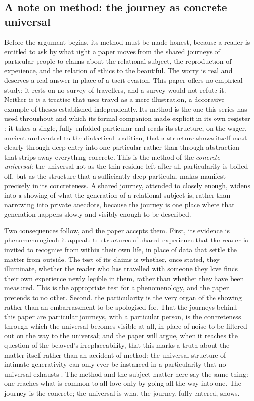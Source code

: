 \subsection{A note on method: the journey as concrete universal}
\label{p21:sub:intro-method}

Before the argument begins, its method must be made honest, because a reader is entitled to ask by what right a paper moves from the shared journeys of particular people to claims about the relational subject, the reproduction of experience, and the relation of ethics to the beautiful. The worry is real and deserves a real answer in place of a tacit evasion. This paper offers no empirical study; it rests on no survey of travellers, and a survey would not refute it. Neither is it a treatise that uses travel as a mere illustration, a decorative example of theses established independently. Its method is the one this series has used throughout and which its formal companion made explicit in its own register \parencite{wan2026braid}: it takes a single, fully unfolded particular and reads its structure, on the wager, ancient and central to the dialectical tradition, that a structure shows itself most clearly through deep entry into one particular rather than through abstraction that strips away everything concrete. This is the method of the \emph{concrete universal}: the universal not as the thin residue left after all particularity is boiled off, but as the structure that a sufficiently deep particular makes manifest precisely in its concreteness. A shared journey, attended to closely enough, widens into a showing of what the generation of a relational subject is, rather than narrowing into private anecdote, because the journey is one place where that generation happens slowly and visibly enough to be described.

Two consequences follow, and the paper accepts them. First, its evidence is phenomenological: it appeals to structures of shared experience that the reader is invited to recognise from within their own life, in place of data that settle the matter from outside. The test of its claims is whether, once stated, they illuminate, whether the reader who has travelled with someone they love finds their own experience newly legible in them, rather than whether they have been measured. This is the appropriate test for a phenomenology, and the paper pretends to no other. Second, the particularity is the very organ of the showing rather than an embarrassment to be apologised for. That the journeys behind this paper are particular journeys, with a particular person, is the concreteness through which the universal becomes visible at all, in place of noise to be filtered out on the way to the universal; and the paper will argue, when it reaches the question of the beloved's irreplaceability, that this marks a truth about the matter itself rather than an accident of method: the universal structure of intimate generativity can only ever be instanced in a particularity that no universal exhausts \parencite{wan2026braid}. The method and the subject matter here say the same thing: one reaches what is common to all love only by going all the way into one. The journey is the concrete; the universal is what the journey, fully entered, shows.

